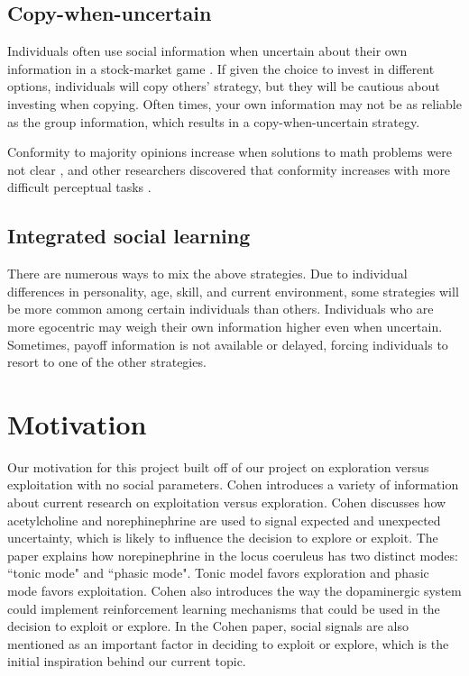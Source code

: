 \documentclass[11pt, a4paper]{article}
\begin{document}
\subsection{Copy-when-uncertain}
Individuals often use social information when uncertain about their own information in a stock-market game \cite{Toelch2013a}. If given the choice to invest in different options, individuals will copy others' strategy, but they will be cautious about investing when copying. Often times, your own information may not be as reliable as the group information, which results in a copy-when-uncertain strategy.

Conformity to majority opinions increase when solutions to math problems were not clear \cite{Laughlin_1986}, and other researchers discovered that conformity increases with more difficult perceptual tasks \cite{Baron_1996}.

\subsection{Integrated social learning}
There are numerous ways to mix the above strategies. Due to individual differences in personality, age, skill, and current environment, some strategies will be more common among certain individuals than others. Individuals who are more egocentric may weigh their own information higher even when uncertain. Sometimes, payoff information is not available or delayed, forcing individuals to resort to one of the other strategies.

\section{Motivation}

Our motivation for this project built off of our project on exploration versus exploitation with no social parameters. Cohen \cite{Cohen2007} introduces a variety of information about current research on exploitation versus exploration. Cohen discusses how acetylcholine and norephinephrine are used to signal expected and unexpected uncertainty, which is likely to influence the decision to explore or exploit. The paper explains how norepinephrine in the locus coeruleus has two distinct modes: ``tonic mode" and ``phasic mode". Tonic model favors exploration and phasic mode favors exploitation. Cohen also introduces the way the dopaminergic system could implement reinforcement learning mechanisms that could be used in the decision to exploit or explore. In the Cohen paper, social signals are also mentioned as an important factor in deciding to exploit or explore, which is the initial inspiration behind our current topic. 
\end{document}

